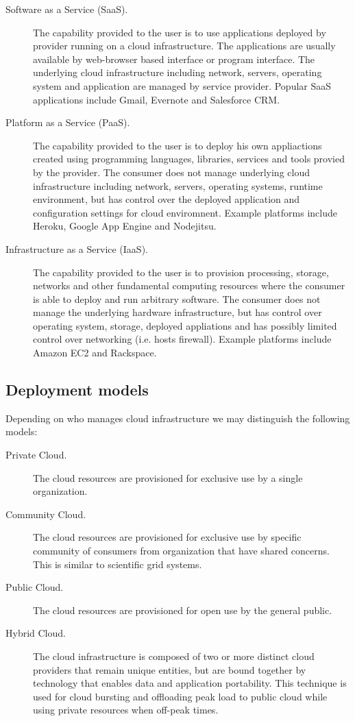 \begin{description}
  \item[Software as a Service (SaaS).] The capability provided to the user is to use applications deployed by provider running on a cloud infrastructure. The applications are usually available by web-browser based interface or program interface. The underlying cloud infrastructure including network, servers, operating system and application are managed by service provider. Popular SaaS applications include Gmail, Evernote and Salesforce CRM.
  \item[Platform as a Service (PaaS).] The capability provided to the user is to deploy his own appliactions created using programming languages, libraries, services and tools provied by the provider. The consumer does not manage underlying cloud infrastructure including network, servers, operating systems, runtime environment, but has control over the deployed application and configuration settings for cloud enviromnent. Example platforms include Heroku, Google App Engine and Nodejitsu.
  \item[Infrastructure as a Service (IaaS).] The capability provided to the user is to provision processing, storage, networks and other fundamental computing resources where the consumer is able to deploy and run arbitrary software. The consumer does not manage the underlying hardware infrastructure, but has control over operating system, storage, deployed appliations and has possibly limited control over networking (i.e. hosts firewall). Example platforms include Amazon EC2 and Rackspace.
\end{description}

\subsection{Deployment models}

Depending on who manages cloud infrastructure we may distinguish the following models:

\begin{description}
  \item[Private Cloud.] The cloud resources are provisioned for exclusive use by a single organization.
  \item[Community Cloud.] The cloud resources are provisioned for exclusive use by specific community of consumers from organization that have shared concerns. This is similar to scientific grid systems.
  \item[Public Cloud.] The cloud resources are provisioned for open use by the general public.
  \item[Hybrid Cloud.] The cloud infrastructure is composed of two or more distinct cloud providers that remain unique entities, but are bound together by technology that enables data and application portability. This technique is used for cloud bursting and offloading peak load to public cloud while using private resources when off-peak times.
\end{description}

